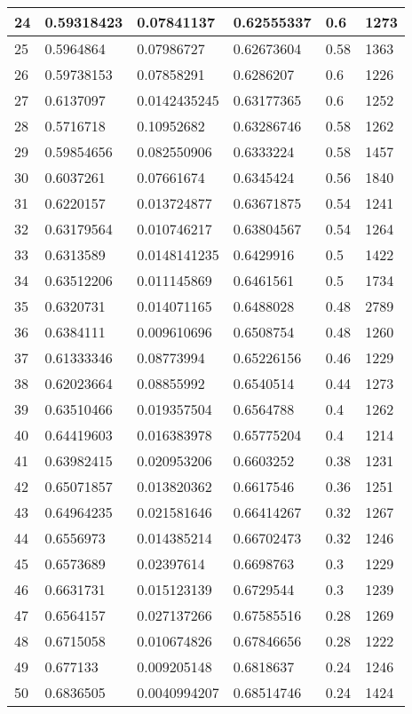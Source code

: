 \begin{longtable}{|l|l|l|l|l|l|}
24 & 0.59318423 & 0.07841137 & 0.62555337 & 0.6 & 1273 \\ \hline 
25 & 0.5964864 & 0.07986727 & 0.62673604 & 0.58 & 1363 \\ \hline 
26 & 0.59738153 & 0.07858291 & 0.6286207 & 0.6 & 1226 \\ \hline 
27 & 0.6137097 & 0.0142435245 & 0.63177365 & 0.6 & 1252 \\ \hline 
28 & 0.5716718 & 0.10952682 & 0.63286746 & 0.58 & 1262 \\ \hline 
29 & 0.59854656 & 0.082550906 & 0.6333224 & 0.58 & 1457 \\ \hline 
30 & 0.6037261 & 0.07661674 & 0.6345424 & 0.56 & 1840 \\ \hline 
31 & 0.6220157 & 0.013724877 & 0.63671875 & 0.54 & 1241 \\ \hline 
32 & 0.63179564 & 0.010746217 & 0.63804567 & 0.54 & 1264 \\ \hline 
33 & 0.6313589 & 0.0148141235 & 0.6429916 & 0.5 & 1422 \\ \hline 
34 & 0.63512206 & 0.011145869 & 0.6461561 & 0.5 & 1734 \\ \hline 
35 & 0.6320731 & 0.014071165 & 0.6488028 & 0.48 & 2789 \\ \hline 
36 & 0.6384111 & 0.009610696 & 0.6508754 & 0.48 & 1260 \\ \hline 
37 & 0.61333346 & 0.08773994 & 0.65226156 & 0.46 & 1229 \\ \hline 
38 & 0.62023664 & 0.08855992 & 0.6540514 & 0.44 & 1273 \\ \hline 
39 & 0.63510466 & 0.019357504 & 0.6564788 & 0.4 & 1262 \\ \hline 
40 & 0.64419603 & 0.016383978 & 0.65775204 & 0.4 & 1214 \\ \hline 
41 & 0.63982415 & 0.020953206 & 0.6603252 & 0.38 & 1231 \\ \hline 
42 & 0.65071857 & 0.013820362 & 0.6617546 & 0.36 & 1251 \\ \hline 
43 & 0.64964235 & 0.021581646 & 0.66414267 & 0.32 & 1267 \\ \hline 
44 & 0.6556973 & 0.014385214 & 0.66702473 & 0.32 & 1246 \\ \hline 
45 & 0.6573689 & 0.02397614 & 0.6698763 & 0.3 & 1229 \\ \hline 
46 & 0.6631731 & 0.015123139 & 0.6729544 & 0.3 & 1239 \\ \hline 
47 & 0.6564157 & 0.027137266 & 0.67585516 & 0.28 & 1269 \\ \hline 
48 & 0.6715058 & 0.010674826 & 0.67846656 & 0.28 & 1222 \\ \hline 
49 & 0.677133 & 0.009205148 & 0.6818637 & 0.24 & 1246 \\ \hline 
50 & 0.6836505 & 0.0040994207 & 0.68514746 & 0.24 & 1424 \\ \hline 
\end{longtable}